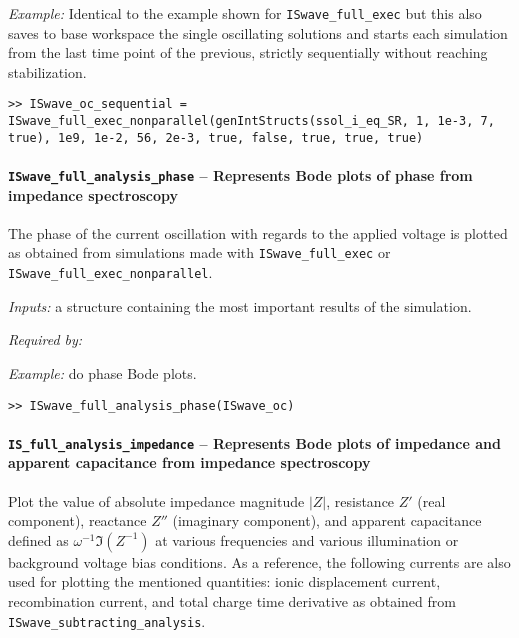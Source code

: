 
\textit{Example:} Identical to the example shown for \texttt{ISwave\_full\_exec} but this also saves to base workspace the single oscillating solutions and starts each simulation from the last time point of the previous, strictly sequentially without reaching stabilization.
\begin{lstlisting}[style=Matlab-editor]
>> ISwave_oc_sequential = ISwave_full_exec_nonparallel(genIntStructs(ssol_i_eq_SR, 1, 1e-3, 7, true), 1e9, 1e-2, 56, 2e-3, true, false, true, true, true)
\end{lstlisting}

		\paragraph{\texttt{ISwave\_full\_analysis\_phase} -- Represents Bode plots of phase from impedance spectroscopy}
		The phase of the current oscillation with regards to the applied voltage is plotted as obtained from simulations made with \texttt{ISwave\_full\_exec} or \texttt{ISwave\_full\_exec\_nonparallel}.
		
		
		\textit{Inputs:} a structure containing the most important results of the simulation.
		
		
		
		\textit{Required by:} 
		
				
				\textit{Example:} do phase Bode plots.
				\begin{lstlisting}[style=Matlab-editor]
>> ISwave_full_analysis_phase(ISwave_oc)
				\end{lstlisting}
				
\paragraph{\texttt{IS\_full\_analysis\_impedance} -- Represents Bode plots of impedance and apparent capacitance from impedance spectroscopy}
Plot the value of absolute impedance magnitude $|Z|$, resistance $Z'$ (real component), reactance $Z''$ (imaginary component), and apparent capacitance defined as $\omega^{-1}\Im(Z^{-1})$ at various frequencies and various illumination or background voltage bias conditions.
As a reference, the following currents are also used for plotting the mentioned quantities: ionic displacement current, recombination current, and total charge time derivative as obtained from \texttt{ISwave\_subtracting\_analysis}.

